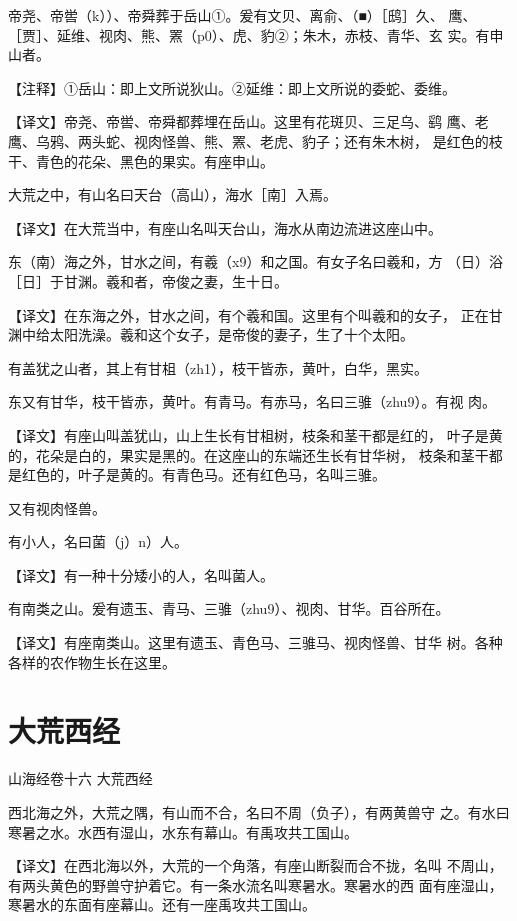 \documentclass[a4paper,12pt,UTF8,twoside]{ctexbook}
\begin{document}
帝尧、帝喾（k））、帝舜葬于岳山①。爰有文贝、离俞、（■）［鸱］久、 鹰、［贾］、延维、视肉、熊、罴（p0）、虎、豹②；朱木，赤枝、青华、玄 实。有申山者。

【注释】①岳山：即上文所说狄山。②延维：即上文所说的委蛇、委维。

【译文】帝尧、帝喾、帝舜都葬埋在岳山。这里有花斑贝、三足乌、鹞 鹰、老鹰、乌鸦、两头蛇、视肉怪兽、熊、罴、老虎、豹子；还有朱木树， 是红色的枝干、青色的花朵、黑色的果实。有座申山。

大荒之中，有山名曰天台（高山），海水［南］入焉。

【译文】在大荒当中，有座山名叫天台山，海水从南边流进这座山中。

东（南）海之外，甘水之间，有羲（x9）和之国。有女子名曰羲和，方 （日）浴［日］于甘渊。羲和者，帝俊之妻，生十日。

【译文】在东海之外，甘水之间，有个羲和国。这里有个叫羲和的女子， 正在甘渊中给太阳洗澡。羲和这个女子，是帝俊的妻子，生了十个太阳。

有盖犹之山者，其上有甘柤（zh1），枝干皆赤，黄叶，白华，黑实。

东又有甘华，枝干皆赤，黄叶。有青马。有赤马，名曰三骓（zhu9）。有视 肉。

【译文】有座山叫盖犹山，山上生长有甘柤树，枝条和茎干都是红的， 叶子是黄的，花朵是白的，果实是黑的。在这座山的东端还生长有甘华树， 枝条和茎干都是红色的，叶子是黄的。有青色马。还有红色马，名叫三骓。

又有视肉怪兽。

有小人，名曰菌（j）n）人。

【译文】有一种十分矮小的人，名叫菌人。

有南类之山。爰有遗玉、青马、三骓（zhu9）、视肉、甘华。百谷所在。

【译文】有座南类山。这里有遗玉、青色马、三骓马、视肉怪兽、甘华 树。各种各样的农作物生长在这里。

\chapter{大荒西经}

山海经卷十六 大荒西经

西北海之外，大荒之隅，有山而不合，名曰不周（负子），有两黄兽守 之。有水曰寒暑之水。水西有湿山，水东有幕山。有禹攻共工国山。

【译文】在西北海以外，大荒的一个角落，有座山断裂而合不拢，名叫 不周山，有两头黄色的野兽守护着它。有一条水流名叫寒暑水。寒暑水的西 面有座湿山，寒暑水的东面有座幕山。还有一座禹攻共工国山。
\end{document}
